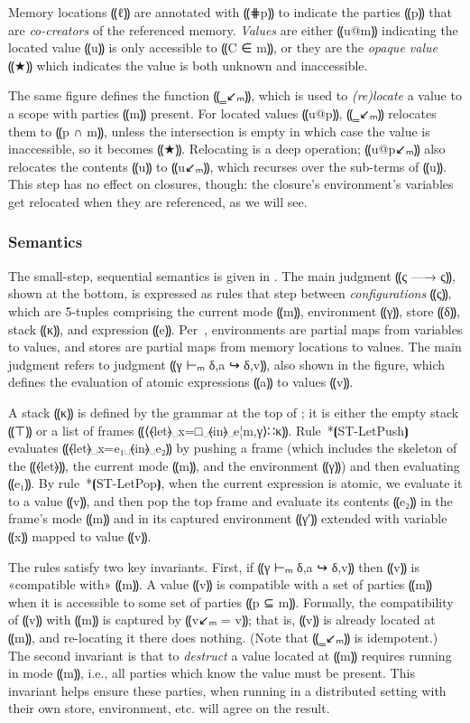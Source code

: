 Memory locations ⸨ℓ⸩ are annotated with ⸨⋕p⸩ to indicate the parties
⸨p⸩ that are \emph{co-creators} of the referenced memory. \emph{Values}
are either ⸨u@m⸩ indicating the located value ⸨u⸩ is only accessible to ⸨C ∈ m⸩,
or they are the \emph{opaque value} ⸨★⸩ which indicates the value is both
unknown and inaccessible.

The same figure defines the function ⸨‗↙ₘ⸩, which is used to \emph{(re)locate} a
value to a scope with parties ⸨m⸩ present. For located values ⸨u@p⸩, ⸨‗↙ₘ⸩
relocates them to ⸨p ∩ m⸩, unless the intersection is empty in which case the
value is inaccessible, so it becomes ⸨★⸩. Relocating is a deep operation;
⸨u@p↙ₘ⸩ also relocates the contents ⸨u⸩ to ⸨u↙ₘ⸩, which recurses over
the sub-terms of ⸨u⸩. This step has no effect on closures, though: the closure's
environment's variables get relocated when they are referenced, as we will see.


\subsubsection{Semantics}
\label{subsubsec:mpc-design-seq-sem}

The small-step, sequential semantics is given in . The
main judgment ⸨ς —→ ς⸩, shown at the bottom, is expressed as rules that step
between \emph{configurations} ⸨ς⸩, which are 5-tuples comprising the current
mode ⸨m⸩, environment ⸨γ⸩, store ⸨δ⸩, stack ⸨κ⸩, and expression ⸨e⸩.
Per~, environments are partial maps from variables to
values, and stores are partial maps from memory locations to values. The main
judgment refers to judgment ⸨γ ⊢ₘ δ,a ↪ δ,v⸩, also shown in the figure, which
defines the evaluation of atomic expressions ⸨a⸩ to values ⸨v⸩.

A stack ⸨κ⸩ is defined by the grammar at the top of
; it is either the empty stack ⸨⊤⸩ or a
list of frames ⸨⟨⦑let⦒␣x=□␣⦑in⦒␣e¦m,γ⟩∷κ⸩. Rule~*⦗ST-LetPush⦘ evaluates
⸨⦑let⦒␣x=e₁␣⦑in⦒␣e₂⸩ by pushing a frame (which includes the skeleton of the
⸨⦑let⦒⸩, the current mode ⸨m⸩, and the environment ⸨γ⸩) and then evaluating
⸨e₁⸩. By rule~*⦗ST-LetPop⦘, when the current expression is atomic, we
evaluate it to a value ⸨v⸩, and then pop the top frame and evaluate its
contents ⸨e₂⸩ in the frame's mode ⸨m⸩ and in its captured environment ⸨γ′⸩
extended with variable ⸨x⸩ mapped to value ⸨v⸩.

The rules satisfy two key invariants. First, if ⸨γ ⊢ₘ δ,a ↪ δ,v⸩ then ⸨v⸩ is «compatible
with» ⸨m⸩. A value ⸨v⸩ is compatible with a set of parties ⸨m⸩ when it is
accessible to some set of parties ⸨p ⊆ m⸩. Formally, the compatibility of ⸨v⸩
with ⸨m⸩ is captured by ⸨v↙ₘ = v⸩; that is, ⸨v⸩ is already located at ⸨m⸩, and
re-locating it there does nothing. (Note that ⸨‗↙ₘ⸩ is idempotent.)
The second invariant is that to \emph{destruct} a value located at ⸨m⸩
requires running in mode ⸨m⸩, i.e., all parties which know the value must be
present. This invariant helps ensure these parties, when running in a
distributed setting with their own store, environment, etc. will agree on the
result.

